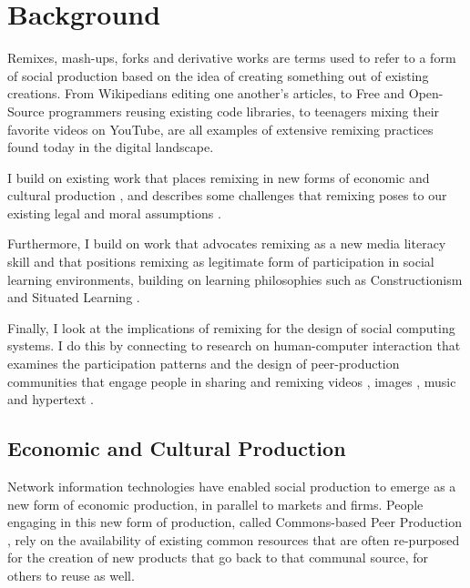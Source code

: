 \chapter{Background}

Remixes, mash-ups, forks and derivative works are terms used to refer to a form of social production based on the idea of creating something out of existing creations.
From Wikipedians editing one another's articles, to Free and Open-Source programmers reusing existing code libraries, to teenagers mixing their favorite videos on YouTube, are all examples of extensive remixing practices found today in the digital landscape.

I build on existing work that places remixing in new forms of economic and cultural production \citep{benkler_wealth_2006, jenkins_convergence_2006,manovich_remix_2005,sinnreich_ethics_2009}, and describes some challenges that remixing poses to our existing legal and moral assumptions \citep{lessig_remix:_2008, posner_little_2007}.

Furthermore, I build on work that advocates remixing as a new media literacy skill \citep{ito_hanging_2010, jenkins_confronting_2009, livingstone_taking_2008, perkel_copy_2008} and that positions remixing as legitimate form of participation in social learning environments, building on learning philosophies such as Constructionism \citep{papert_mindstorms_1980} and Situated Learning \citep{lave_situated_1991}.

Finally, I look at the implications of remixing for the design of social computing systems. I do this by connecting to research on human-computer interaction that examines the participation patterns and the design of peer-production communities that engage people in sharing and remixing videos \citep{diakopoulos_evolution_2007,shaw_community_2006}, images \citep{seneviratne_policy-aware_2009}, music \citep{cheliotis_analysis_2009} and hypertext \citep{viegas_studying_2004}.

\section{Economic and Cultural Production}

Network information technologies have enabled social production to emerge as a new form of economic production, in parallel to markets and firms.
People engaging in this new form of production, called Commons-based Peer Production \citep{benkler_coases_2002}, rely on the availability of existing common resources that are often re-purposed for the creation of new products that go back to that communal source, for others to reuse as well.


